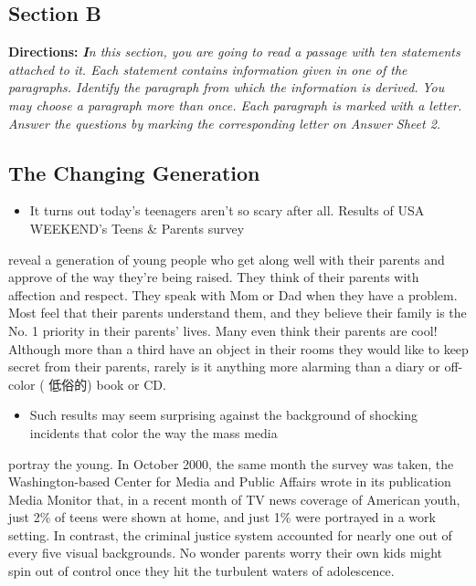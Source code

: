\documentclass[UTF8,11pt]{ctexart}
\begin{document}
\subsection*{\textbf{Section B}}


\textbf{Directions:} \textbf{\textit{I}}\textit{n this section, you are going to read a passage with ten statements attached to it. Each statement} \textit{contains information given in one of the paragraphs. Identify the paragraph from which the information is derived.} \textit{You may choose a paragraph more than once. Each paragraph is marked with a letter. Answer the questions by} \textit{marking the corresponding letter on Answer Sheet 2.}


\subsection*{\textbf{The Changing Generation}}


\begin{itemize}[leftmargin=2em,itemsep=.2em,topsep=.4em]\item[A.] It turns out today’s teenagers aren’t so scary after all. Results of USA WEEKEND’s Teens \& Parents survey
\end{itemize}

reveal a generation of young people who get along well with their parents and approve of the way they’re being raised. They think of their parents with affection and respect. They speak with Mom or Dad when they have a problem. Most feel that their parents understand them, and they believe their family is the No. 1 priority in their parents’ lives. Many even think their parents are cool! Although more than a third have an object in their rooms they would like to keep secret from their parents, rarely is it anything more alarming than a diary or off-color ( 低俗的) book or CD.


\begin{itemize}[leftmargin=2em,itemsep=.2em,topsep=.4em]\item[B.] Such results may seem surprising against the background of shocking incidents that color the way the mass media
\end{itemize}

portray the young. In October 2000, the same month the survey was taken, the Washington-based Center for Media and Public Affairs wrote in its publication Media Monitor that, in a recent month of TV news coverage of American youth, just 2\% of teens were shown at home, and just 1\% were portrayed in a work setting. In contrast, the criminal justice system accounted for nearly one out of every five visual backgrounds. No wonder parents worry their own kids might spin out of control once they hit the turbulent waters of adolescence.
\end{document}
